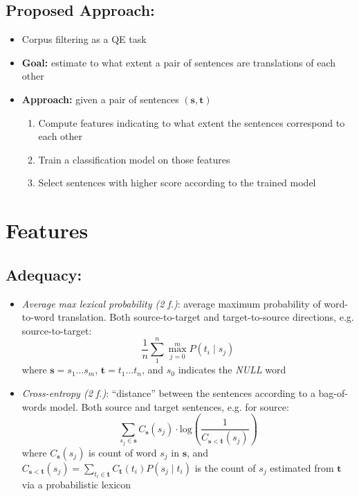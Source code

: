 \documentclass[a0]{sciposter}
\begin{document}
\begin{multicols*}{2}
\subsection*{Proposed Approach:}
\begin{itemize}
  \item Corpus filtering as a QE task
  \item {\bf Goal:} estimate to what extent a pair of sentences are translations of each other
  \item {\bf Approach:} given a pair of sentences $(\mathbf{s}, \mathbf{t})$
  \begin{enumerate}
    \item Compute features indicating to what extent the sentences correspond to each other
    \item Train a classification model on those features
    \item Select sentences with higher score according to the trained model
  \end{enumerate}
\end{itemize}


\section*{\Large Features}
\subsection*{Adequacy:} 
\begin{itemize}
  \item \textit{Average max lexical probability (2 f.)}: average maximum probability of word-to-word translation. Both source-to-target and target-to-source directions, e.g.  source-to-target:
  $$ \frac{1}{n}\sum_1^n\max_{j=0}^m P(t_i\mid s_j) $$
  where $\mathbf{s}=s_1\ldots s_m$, $\mathbf{t}=t_1\ldots t_n$, and $s_0$ indicates the \textit{NULL} word
  \item \textit{Cross-entropy (2 f.)}: ``distance'' between the sentences according to a bag-of-words model. Both source and target sentences, e.g. for source:
  $$\sum_{s_j\in\mathbf{s}}C_{\mathbf{s}}(s_j)\cdot\mathrm{log}\left(\frac{1}{C_{\mathbf{s}<\mathbf{t}}(s_j)}\right)$$
  where $C_{\mathbf{s}}(s_j)$ is count of word $s_j$ in $\mathbf{s}$, and $C_{\mathbf{s}<\mathbf{t}}(s_j)=\sum_{t_i\in\mathbf{t}}C_{\mathbf{t}}(t_i)P(s_j\mid t_i)$ is the count of $s_j$ estimated from $\mathbf{t}$ via a probabilistic lexicon 
\end{itemize}


\end{multicols*}
\end{document}
